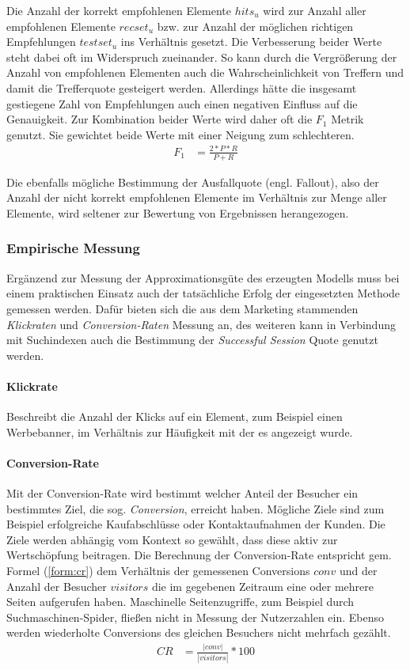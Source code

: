Die Anzahl der korrekt empfohlenen Elemente $hits_u$ wird zur Anzahl aller empfohlenen Elemente $recset_u$ bzw. zur Anzahl der möglichen richtigen Empfehlungen $testset_u$ ins Verhältnis gesetzt. Die Verbesserung beider Werte steht dabei oft im Widerspruch zueinander. So kann durch die Vergrößerung der Anzahl von empfohlenen Elementen auch die Wahrscheinlichkeit von Treffern und damit die Trefferquote gesteigert werden. Allerdings hätte die insgesamt gestiegene Zahl von Empfehlungen auch einen negativen Einfluss auf die Genauigkeit. Zur Kombination beider Werte wird daher oft die $F_1$ Metrik genutzt. Sie gewichtet beide Werte mit einer Neigung zum schlechteren.
\begin{align}
F_1 & = \frac{2 * P * R}{P+R} \label{form:f1}
\end{align}

Die ebenfalls mögliche Bestimmung der Ausfallquote (engl. Fallout), also der Anzahl der nicht korrekt empfohlenen Elemente im Verhältnis zur Menge aller Elemente, wird seltener zur Bewertung von Ergebnissen herangezogen. \citep{hb_08,rs}

\subsubsection{Empirische Messung}\label{sec:measure_c}

Ergänzend zur Messung der Approximationsgüte des erzeugten Modells muss bei einem praktischen Einsatz auch der tatsächliche Erfolg der eingesetzten Methode gemessen werden. Dafür bieten sich die aus dem Marketing stammenden \textit{Klickraten} und \textit{Conversion-Raten} Messung an, des weiteren kann in Verbindung mit Suchindexen auch die Bestimmung der \textit{Successful Session} Quote genutzt werden.

\paragraph{Klickrate} Beschreibt die Anzahl der Klicks auf ein Element, zum Beispiel einen Werbebanner, im Verhältnis zur Häufigkeit mit der es angezeigt wurde. 

\paragraph{Conversion-Rate} Mit der Conversion-Rate wird bestimmt welcher Anteil der Besucher ein bestimmtes Ziel, die sog. \textit{Conversion}, erreicht haben. Mögliche Ziele sind zum Beispiel erfolgreiche Kaufabschlüsse oder Kontaktaufnahmen der Kunden. Die Ziele werden abhängig vom Kontext so gewählt, dass diese aktiv zur Wertschöpfung beitragen. Die Berechnung der Conversion-Rate entspricht gem. Formel (\ref{form:cr}) dem Verhältnis der gemessenen Conversions $conv$ und der Anzahl der Besucher $visitors$ die im gegebenen Zeitraum eine oder mehrere Seiten aufgerufen haben. Maschinelle Seitenzugriffe, zum Beispiel durch Suchmaschinen-Spider, fließen nicht in Messung der Nutzerzahlen ein. Ebenso werden wiederholte Conversions des gleichen Besuchers nicht mehrfach gezählt. \citep{krueger2011conversion}
\begin{align}
CR & = \frac{|conv|}{|visitors| } * 100 \label{form:cr}
\end{align}

